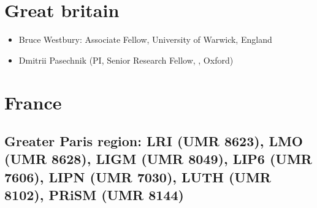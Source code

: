 \section*{Great britain}

\begin{itemize}
\item Bruce Westbury: Associate Fellow, University of Warwick, England
\item Dmitrii Pasechnik (PI, Senior Research Fellow, \CS, Oxford)
\end{itemize}

\section*{France}

\subsection*{Greater Paris region: LRI (UMR 8623),  LMO (UMR 8628), LIGM
  (UMR 8049), LIP6 (UMR 7606), LIPN (UMR 7030), LUTH (UMR 8102), PRiSM (UMR 8144)}


